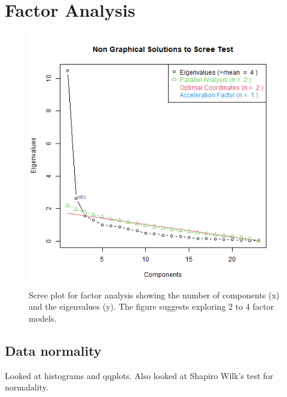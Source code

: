 \documentclass[../main.tex]{subfiles}
\begin{document}
    \section{Factor Analysis}

        \begin{figure}[htb]
            \centering
            \includegraphics[scale=0.5]{figs/010-validation/efa_eigen_scree.png}
            \caption[Scree plot for factor analysis]
            {Scree plot for factor analysis showing the number of components (x) and the eigenvalues (y).
                The figure suggests exploring 2 to 4 factor models.
            }
            \label{fig:scree-fa-all}
        \end{figure}

        \subsection{Data normality}
        \label{ss:fa-data-normality}

            Looked at histograms and qqplots.
            Also looked at Shapiro Wilk's test for normalality.


\end{document}
